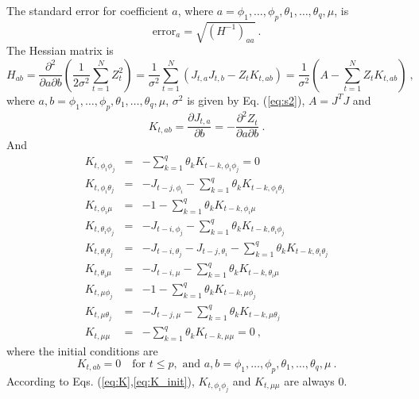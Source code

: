 The standard error for coefficient $a$, where $a=\phi_1,\dots,\phi_p,\theta_1,\dots,\theta_q,\mu$, is
\begin{equation}
\mbox{error}_a = \sqrt{(H^{-1})_{aa}}\ .
\end{equation}
The Hessian matrix is
\begin{equation}
H_{ab} = \frac{\partial^2}{\partial a \partial b}
\left(\frac{1}{2\sigma^2}\sum_{t=1}^N Z_t^2 \right) =
\frac{1}{\sigma^2}\sum_{t=1}^N
\left(J_{t,a}J_{t,b} -
  Z_t K_{t,ab} \right) = \frac{1}{\sigma^2}\left(
  A - \sum_{t=1}^N Z_t K_{t,ab}\right)\ ,
\end{equation}
where $a,b=\phi_1,\dots,\phi_p,\theta_1,\dots,\theta_q,\mu$,
$\sigma^2$ is given by Eq. (\ref{eq:s2}), $A=J^TJ$ and
\begin{equation}
K_{t,ab}=\frac{\partial J_{t,a}}{\partial b} = - \frac{\partial^2
  Z_t}{\partial a \partial b} \ .
\end{equation}
And
\begin{eqnarray}
K_{t,\phi_i\phi_j} &=& -\sum_{k=1}^q \theta_k K_{t-k,\phi_i\phi_j} = 0
\nonumber\\
K_{t,\phi_i\theta_j} &=& -J_{t-j,\phi_i} - \sum_{k=1}^q\theta_k
K_{t-k,\phi_i\theta_j} \nonumber\\
K_{t,\phi_i\mu} &=& -1 -\sum_{k=1}^q\theta_k
K_{t-k,\phi_i\mu}\nonumber \\
K_{t,\theta_i\phi_j} &=& -J_{t-i,\phi_j}-\sum_{k=1}^q\theta_k
K_{t-k,\theta_i\phi_j} \nonumber\\
K_{t,\theta_i\theta_j} &=& -J_{t-i,\theta_j} - J_{t-j,\theta_i} -
\sum_{k=1}^q \theta_k K_{t-k,\theta_i\theta_j} \nonumber \\
K_{t,\theta_i\mu} &=& -J_{t-i,\mu} - \sum_{k=1}^q\theta_k
K_{t-k,\theta_i\mu} \nonumber\\
K_{t,\mu\phi_j} &=& -1-\sum_{k=1}^q \theta_k K_{t-k,\mu\phi_j}
\nonumber \\
K_{t,\mu\theta_j} &=& -J_{t-j,\mu} -\sum_{k=1}^q \theta_k
K_{t-k,\mu\theta_j} \nonumber \\
K_{t,\mu\mu} &=& - \sum_{k=1}^q \theta_k K_{t-k,\mu\mu} = 0\ , \label{eq:K}
\end{eqnarray}
where the initial conditions are
\begin{equation}
K_{t,ab} = 0\quad \mbox{for } t\leq p, \mbox{ and }
a,b=\phi_1,\dots,\phi_p,\theta_1,\dots,\theta_q,\mu\ . \label{eq:K_init}
\end{equation}
According to Eqs. (\ref{eq:K},\ref{eq:K_init}), $K_{t,\phi_i\phi_j}$ and
$K_{t,\mu\mu}$ are always $0$.


